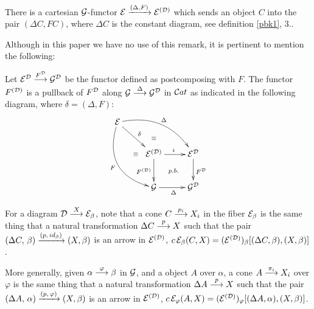 \begin{definitionst}
There is a cartesian $\mathcal{G}$-functor 
$\mathcal{E} \xrightarrow{(\Delta, F)} \mathcal{E}^{(\mathcal{D})}$ which sends an object $C$ into the pair $(\Delta C, FC)$, where $\Delta C$ is the constant diagram, see definition  \ref{pbk1}, 3..
 
%
%
\end{definitionst}

Although in this paper we have no use of this remark, it is pertinent to mention the following:
\begin{remark}\label{F(D) es fibracion} 
Let  $\mathcal{E}^{\mathcal{D}} \overset {F^{\mathcal{D}}} {\longrightarrow}   \mathcal{G}^{\mathcal{D}}$ be the functor defined as postcomposing with $F$. The functor $F^{(\mathcal{D})}$ is a pullback of $F^{\mathcal{D}}$ along $\mathcal{G} \overset {\Delta} {\longrightarrow} \mathcal{G}^{\mathcal{D}}$ in $\mathcal{C}at$ as indicated in the following diagram,  where $\delta = (\Delta, F)$:
$$
\xymatrix{\cc{E} \ar@/^1.5pc/[rrd]^\Delta \ar@/_2.pc/[ddr]_F \ar[dr]^{\delta} & \\
		  &\cc{E}^{(\cc{D})} \ar@{}[l]|\equiv \ar@{}[u]|\equiv \ar[r]^i \ar[d]_{F^{(\cc{D})}} & \cc{E}^{\cc{D}}  \ar[d]^{F^{\cc{D}}} \\
		  &\cc{G} \ar[r]_\Delta & \cc{G}^{\cc{D}} \ar@{}[ul]|{p.b.}}
$$ 

\vspace{-4ex}

\cqd
\end{remark}

\begin{nobservation} \label{cone=arrow}
For a diagram $\mathcal{D} \overset {X} {\longrightarrow} \mathcal{E}_\beta$, note that a cone 
$C \overset {p_i} {\longrightarrow} X_i$ in the fiber $\mathcal{E}_\beta$    
is the same thing that a natural transformation $\Delta C \overset {p} {\longrightarrow} X$ such that the pair   
 \mbox{$(\Delta C, \, \beta) \xrightarrow{(p,\, id_\beta)} (X, \beta)$} is an arrow in 
 $\mathcal{E}^{(\mathcal{D})}$, \;    
 $c\,\mathcal{E}_\beta(C, X) = 
 (\mathcal{E}^{(\mathcal{D})})_\beta[(\Delta C, \beta), (X, \beta)]$.
 \end{nobservation}
 
\vspace{1ex}

More generally, given $\alpha \overset {\varphi} {\longrightarrow} \beta$ in $\mathcal{G}$, and 
a object $A$ over $\alpha$, a  cone  $A \overset {\pi_i} {\longrightarrow} X_i$ over $\varphi$
is the same thing that a natural transformation $\Delta A \overset {p} {\longrightarrow} X$ such that the pair $(\Delta A, \, \alpha) \xrightarrow{(p,\, \varphi)} (X, \beta)$ is an arrow in $\mathcal{E}^{(\mathcal{D})}$, \; 
$c\,\mathcal{E}_\varphi(A, X) = 
 (\mathcal{E}^{(\mathcal{D})})_\varphi[(\Delta A, \alpha), (X, \beta)]$.
%


